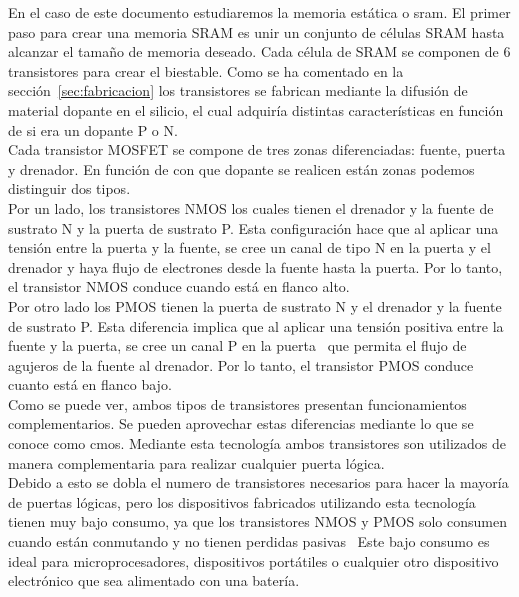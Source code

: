 \documentclass[spanish]{template/minim}
\begin{document}
En el caso de este documento estudiaremos la memoria estática o \gls{sram}. El primer paso para crear una memoria SRAM es unir un conjunto de células SRAM hasta alcanzar el tamaño de memoria deseado. Cada célula de SRAM se componen de 6 transistores para crear el biestable. Como se ha comentado en la sección~\ref{sec:fabricacion} los transistores se fabrican mediante la difusión de material dopante en el silicio, el cual adquiría distintas características en función de si era un dopante {\color{accent}P} o {\color{accent}N}.\\

Cada transistor MOSFET se compone de tres zonas diferenciadas: fuente, puerta y drenador. En función de con que dopante se realicen están zonas podemos distinguir dos tipos.\\

Por un lado, los transistores {\color{accent}N}MOS los cuales tienen el drenador y la fuente de sustrato N y la puerta de sustrato P. Esta configuración hace que al aplicar una tensión entre la puerta y la fuente, se cree un canal de tipo N en la puerta y el drenador y haya flujo de electrones desde la fuente hasta la puerta. Por lo tanto, el transistor NMOS conduce cuando está en flanco alto.\\

Por otro lado los {\color{accent}P}MOS tienen la puerta de sustrato N y el drenador y la fuente de sustrato P. Esta diferencia implica que al aplicar una tensión positiva entre la fuente y la puerta, se cree un canal P en la puerta~ que permita el flujo de agujeros de la fuente al drenador. Por lo tanto, el transistor PMOS conduce cuanto está en flanco bajo.\\

Como se puede ver, ambos tipos de transistores presentan funcionamientos {\color{accent}complementarios}. Se pueden aprovechar estas diferencias mediante lo que se conoce como \gls{cmos}. Mediante esta tecnología ambos transistores son utilizados de manera complementaria para realizar cualquier puerta lógica.\\

Debido a esto se dobla el numero de transistores necesarios para hacer la mayoría de puertas lógicas, pero los dispositivos fabricados utilizando esta tecnología tienen muy bajo consumo, ya que los transistores NMOS y PMOS solo consumen cuando están conmutando y no tienen perdidas pasivas~ Este bajo consumo es ideal para microprocesadores, dispositivos portátiles o cualquier otro dispositivo electrónico que sea alimentado con una batería.\\
\end{document}
